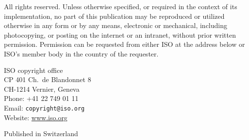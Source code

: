 \vspace{1ex}
\vspace{2ex}

\isocopyright

All rights reserved. Unless otherwise specified,
or required in the context of its implementation,
no part of this publication may be reproduced or
utilized otherwise in any form or by any means,
electronic or mechanical, including photocopying,
or posting on the internet or an intranet,
without prior written permission.
Permission can be requested
from either ISO at the address below
or ISO's member body in the country of the requester.

\begin{indented}
%
ISO copyright office\\
CP 401 \textbullet{} Ch.\ de Blandonnet 8\\
CH-1214 Vernier, Geneva\\
Phone: +41 22 749 01 11\\
Email: \texttt{copyright@iso.org}\\
Website: \url{www.iso.org}
\end{indented}

Published in Switzerland

\newpage
